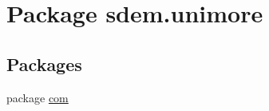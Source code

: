 \hypertarget{namespacesdem_1_1unimore}{\section{Package sdem.\+unimore}
\label{namespacesdem_1_1unimore}
}
\subsection*{Packages}
\begin{DoxyCompactItemize}
\item 
package \hyperlink{namespacesdem_1_1unimore_1_1com}{com}
\end{DoxyCompactItemize}
